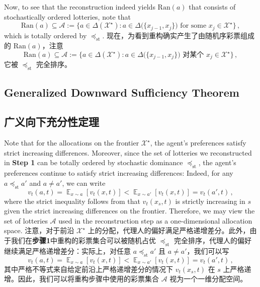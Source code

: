 \documentclass[12pt,letterpaper]{article}
\newenvironment{original}{\color{black}\noindent}{}
\newenvironment{translation}{\color{blue}\noindent}{}
\theoremstyle{plain}
\theoremstyle{definition}
\theoremstyle{remark}
\DeclareMathOperator{\E}{\mathds{E}}
\renewcommand{\1}{\mathds{1}}
\newcommand{\X}{\mathcal{X}}
\theoremstyle{definition}
\begin{document}
\begin{original}
Now, to see that the reconstruction indeed yields $\text{Ran}(a)$ that consists of stochastically ordered lotteries, note that
\[\text{Ran}(a) \subseteq \mathcal{A} :=  \Big\{a\in \Delta(\X^\star): a \in \Delta\big(\{x_{j-1}, x_j\}\big) \text{ for some $x_j \in \X^\star$}\Big\}\,,\]
which is totally ordered by $\preceq_{\text{st}}$.
\end{original}
\begin{translation}
现在，为看到重构确实产生了由随机序彩票组成的 $\text{Ran}(a)$，注意
\[\text{Ran}(a) \subseteq \mathcal{A} :=  \Big\{a\in \Delta(\X^\star): a \in \Delta\big(\{x_{j-1}, x_j\}\big) \text{ 对某个 $x_j \in \X^\star$}\Big\}\,,\]
它被 $\preceq_{\text{st}}$ 完全排序。
\end{translation}

\begin{original}
\subsection{Generalized Downward Sufficiency Theorem}
\end{original}
\begin{translation}
\subsection{广义向下充分性定理}
\end{translation}

\begin{original}
Note that for the allocations on the frontier $\X^\star$, the agent's preferences satisfy strict increasing differences. Moreover, since the set of lotteries we reconstructed in \textbf{Step 1} can be totally ordered by stochastic dominance $\preceq_{\text{st}}$, the agent's preferences continue to satisfy strict increasing differences: Indeed, for any $a \preceq_{\text{st}} a'$ and $a \neq a'$, we can write
\[v_t(a, t) = \E_{x\sim a}[v_t(x, t)] < \E_{x\sim a'}[v_t(x, t)] = v_t(a', t)\,,\]
where the strict inequality follows from that $v_t(x_s, t)$ is strictly increasing in $s$ given the strict increasing differences on the frontier. Therefore, we may view the set of lotteries $\mathcal{A}$ used in the reconstruction step as a one-dimensional allocation space.
\end{original}
\begin{translation}
注意，对于前沿 $\X^\star$ 上的分配，代理人的偏好满足严格递增差分。此外，由于我们在\textbf{步骤1}中重构的彩票集合可以被随机占优 $\preceq_{\text{st}}$ 完全排序，代理人的偏好继续满足严格递增差分：实际上，对任意 $a \preceq_{\text{st}} a'$ 且 $a \neq a'$，我们可以写
\[v_t(a, t) = \E_{x\sim a}[v_t(x, t)] < \E_{x\sim a'}[v_t(x, t)] = v_t(a', t)\,,\]
其中严格不等式来自给定前沿上严格递增差分的情况下 $v_t(x_s, t)$ 在 $s$ 上严格递增。因此，我们可以将重构步骤中使用的彩票集合 $\mathcal{A}$ 视为一个一维分配空间。
\end{translation}
\end{document}
